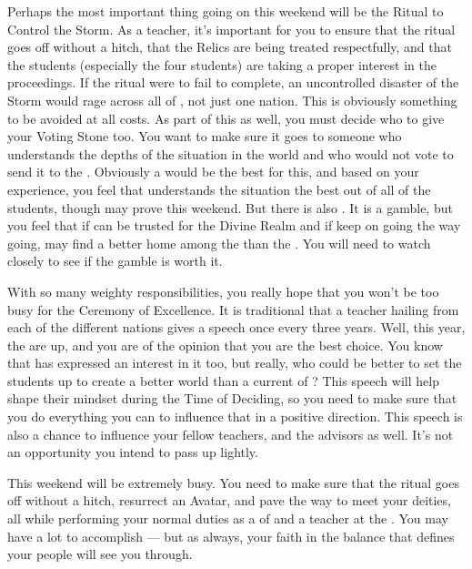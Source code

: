 \documentclass[char]{GL2020}
\begin{document}
Perhaps the most important thing going on this weekend will be the Ritual to Control the Storm. As a teacher, it's important for you to ensure that the ritual goes off without a hitch, that the Relics are being treated respectfully, and that the students (especially the four \pShip{} students) are taking a proper interest in the proceedings. If the ritual were to fail to complete, an uncontrolled disaster of the Storm would rage across all of \pEarth{}, not just one nation. This is obviously something to be avoided at all costs. As part of this as well, you must decide who to give your Voting Stone too. You want to make sure it goes to someone who understands the depths of the situation in the world and who would not vote to send it to the \pShip{}. Obviously a \pShippie{} would be the best for this, and based on your experience, you feel that \cWarlordDaughter{} understands the situation the best out of all of the students, though \cInitiate{} may prove \cInitiate{\themself} this weekend. But there is also \cAmbition{}. It is a gamble, but you feel that if \cAmbition{\they} can be trusted for the Divine Realm and if \cAmbition{\they} keep\cAmbition{\verbs} on going the way \cAmbition{\theyare} going, \cAmbition{\they} may find a better home among the \pShippies{} than the \pTech{}. You will need to watch \cAmbition{\them} closely to see if the gamble is worth it. 

With so many weighty responsibilities, you really hope that you won't be too busy for the Ceremony of Excellence. It is traditional that a teacher hailing from each of the different nations gives a speech once every three years. Well, this year, the \pShip{} are up, and you are of the opinion that you are the best choice. You know that \cPirate{} has expressed an interest in it too, but really, who could be better to set the students up to create a better world than a current \cFlowPriest{\cleric} of \cFlowFull{\intro}? This speech will help shape their mindset during the Time of Deciding, so you need to make sure that you do everything you can to influence that in a positive direction. This speech is also a chance to influence your fellow teachers, and the advisors as well. It's not an opportunity you intend to pass up lightly.

This weekend will be extremely busy. You need to make sure that the ritual goes off without a hitch, resurrect an Avatar, and pave the way to meet your deities, all while performing your normal duties as a \cFlowPriest{\cleric} of \cFlow{} and a teacher at the \pSchool{}. You may have a lot to accomplish — but as always, your faith in the balance that defines your people will see you through.
\end{document}
